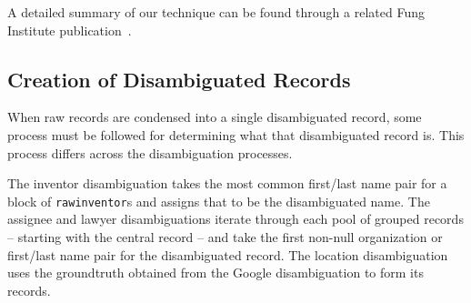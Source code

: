 A detailed summary of our technique can be found through a related
Fung Institute publication~\cite{newdisambiguation}.

\subsection{Creation of Disambiguated Records}

When raw records are condensed into a single disambiguated record, some process must
be followed for determining what that disambiguated record is. This process differs across
the disambiguation processes. 

The inventor disambiguation takes the most common first/last name pair for a block of
\verb`rawinventor`s and assigns that to be the disambiguated name. The assignee and
lawyer disambiguations iterate through each pool of grouped records -- starting with
the central record -- and take the first non-null organization or first/last name pair for
the disambiguated record. The location disambiguation uses the groundtruth obtained
from the Google disambiguation to form its records.
